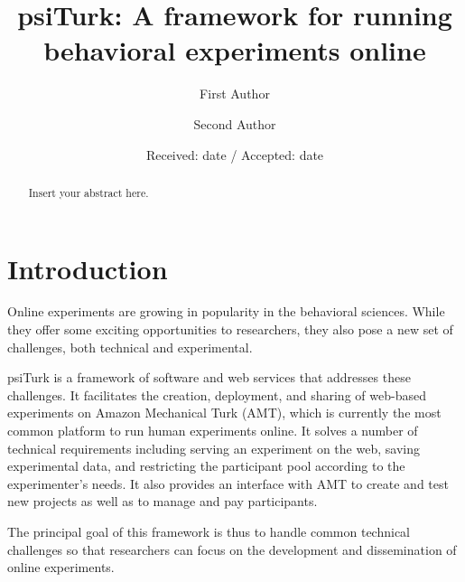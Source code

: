 \documentclass[twocolumn]{svjour3}          %
\begin{document}
\title{psiTurk: A framework for running behavioral experiments online}

\author{First Author         \and
        Second Author %
}




\date{Received: date / Accepted: date}

\maketitle

\begin{abstract}
Insert your abstract here.
\end{abstract}


\section{Introduction}

Online experiments are growing in popularity in the behavioral sciences.
While they offer some exciting opportunities to researchers, they also pose 
a new set of challenges, both technical and experimental.

psiTurk is a framework of software and web services that addresses these challenges. 
It facilitates the creation, deployment, and sharing of web-based experiments on Amazon Mechanical Turk (AMT),
 which is currently the most common platform to run human experiments online.
It solves a number of technical requirements including serving an experiment on the web, saving experimental data, and restricting the participant pool according to the experimenter's needs. It also provides an interface with AMT to create and test new projects as well as to manage and
 pay participants.

The principal goal of this framework is thus to handle common technical challenges so that researchers can focus on the development and dissemination of online experiments.
\end{document}
